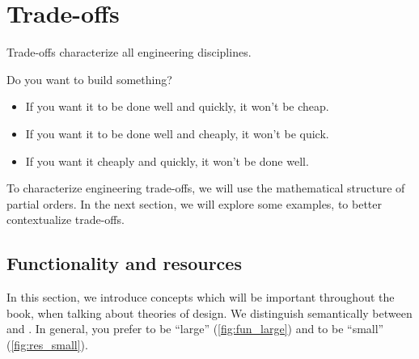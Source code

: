 
\section{Trade-offs}

\begin{marginfigure}
    \centering
    \caption{}
    \label{fig:fast_good_cheap}
\end{marginfigure}

Trade-offs characterize all engineering disciplines.

Do you want to build something?
\begin{itemize}
    \item If you want it to be done well and quickly, it won't be cheap.
    \item If you want it to be done well and cheaply, it won't be quick.
    \item If you want it cheaply and quickly, it won't be done well.
\end{itemize}

To characterize engineering trade-offs, we will use the mathematical structure of partial orders.
In the next section, we will explore some examples, to better contextualize trade-offs.

\subsection{Functionality and resources}


In this section, we introduce concepts which will be important throughout the book, when talking about theories of design.
We distinguish semantically between  and .
In general, you prefer  to be ``large'' (\cref{fig:fun_large}) and  to be ``small'' (\cref{fig:res_small}).

